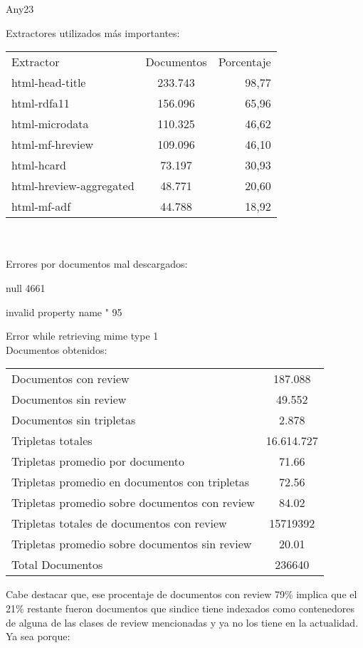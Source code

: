 Any23

Extractores utilizados más importantes:\\
\begin{tabular}{| l | c | r | }
Extractor & Documentos & Porcentaje \\
html-head-title & 233.743 & 98,77 \\    
html-rdfa11 & 156.096 & 65,96 \\
html-microdata & 110.325 & 46,62 \\    
html-mf-hreview & 109.096 & 46,10 \\
html-hcard & 73.197 & 30,93  \\
html-hreview-aggregated & 48.771 & 20,60 \\
html-mf-adf & 44.788 & 18,92 \\
 \end{tabular}
\\
\\
Errores por documentos mal descargados:

null 4661

invalid property name " 95

Error while retrieving mime type 1
\\ 
 
Documentos obtenidos:

\begin{tabular}{| l | c | }
Documentos con review & 187.088 \\
Documentos sin review & 49.552\\
Documentos sin tripletas & 2.878\\
Tripletas totales & 16.614.727\\
Tripletas promedio por documento & 71.66\\
Tripletas promedio en documentos con tripletas & 72.56\\
Tripletas promedio sobre documentos con review & 84.02\\
Tripletas totales de documentos con review & 15719392\\
Tripletas promedio sobre documentos sin review & 20.01\\
Total Documentos & 236640\\
\end{tabular}

Cabe destacar que, ese procentaje de documentos con review 79\% implica que el 21\% restante fueron documentos que sindice tiene indexados como contenedores de 
alguna de las clases de review mencionadas y ya no los tiene en la actualidad. Ya sea porque:

